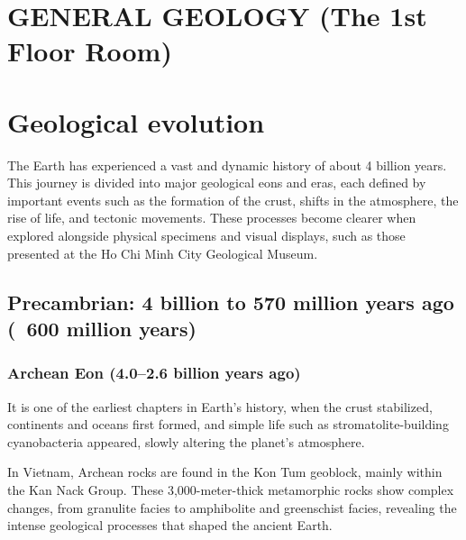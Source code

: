 \section{GENERAL GEOLOGY (The 1st Floor Room)}
\label{chap:general-geology}

\section{Geological evolution}
\label{sec:geological-evolution}

The Earth has experienced a vast and dynamic history of about 4 billion years. This journey is divided into major geological eons and eras, each defined by important events such as the formation of the crust, shifts in the atmosphere, the rise of life, and tectonic movements. These processes become clearer when explored alongside physical specimens and visual displays, such as those presented at the Ho Chi Minh City Geological Museum.

\subsection{Precambrian: 4 billion to 570 million years ago (~600 million years)}
\label{subsec:precambrian}

\subsubsection{Archean Eon (4.0–2.6 billion years ago)}
\label{subsubsec:archean}

It is one of the earliest chapters in Earth's history, when the crust stabilized, continents and oceans first formed, and simple life such as stromatolite-building cyanobacteria appeared, slowly altering the planet's atmosphere.

In Vietnam, Archean rocks are found in the Kon Tum geoblock, mainly within the Kan Nack Group. These 3,000-meter-thick metamorphic rocks show complex changes, from granulite facies to amphibolite and greenschist facies, revealing the intense geological processes that shaped the ancient Earth.

